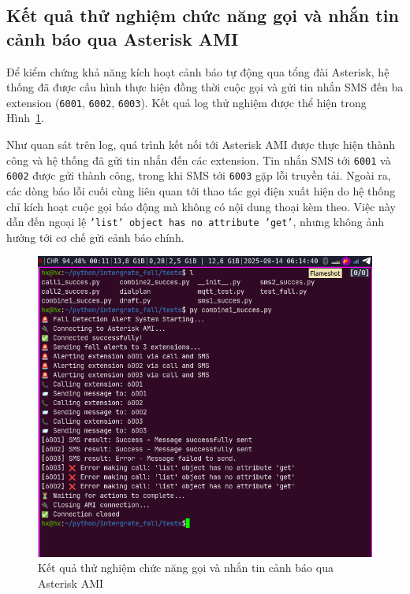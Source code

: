 \subsection{Kết quả thử nghiệm chức năng gọi và nhắn tin cảnh báo qua Asterisk AMI}
\label{subsec:ast_call_sms_test}

Để kiểm chứng khả năng kích hoạt cảnh báo tự động qua tổng đài Asterisk, hệ thống đã được cấu hình thực hiện đồng thời cuộc gọi và gửi tin nhắn SMS đến ba extension (\texttt{6001}, \texttt{6002}, \texttt{6003}). Kết quả log thử nghiệm được thể hiện trong Hình~\ref{fig:ast_call_sms_test}.

Như quan sát trên log, quá trình kết nối tới Asterisk AMI được thực hiện thành công và hệ thống đã gửi tin nhắn đến các extension. Tin nhắn SMS tới \texttt{6001} và \texttt{6002} được gửi thành công, trong khi SMS tới \texttt{6003} gặp lỗi truyền tải. Ngoài ra, các dòng báo lỗi cuối cùng liên quan tới thao tác gọi điện xuất hiện do hệ thống chỉ kích hoạt cuộc gọi báo động mà không có nội dung thoại kèm theo. Việc này dẫn đến ngoại lệ \texttt{'list' object has no attribute 'get'}, nhưng không ảnh hưởng tới cơ chế gửi cảnh báo chính.

\begin{figure}[H]
    \centering
    \includegraphics[width=0.95\linewidth]{figures/ast_call_sms_test.png}
    \caption{Kết quả thử nghiệm chức năng gọi và nhắn tin cảnh báo qua Asterisk AMI}
    \label{fig:ast_call_sms_test}
\end{figure}

